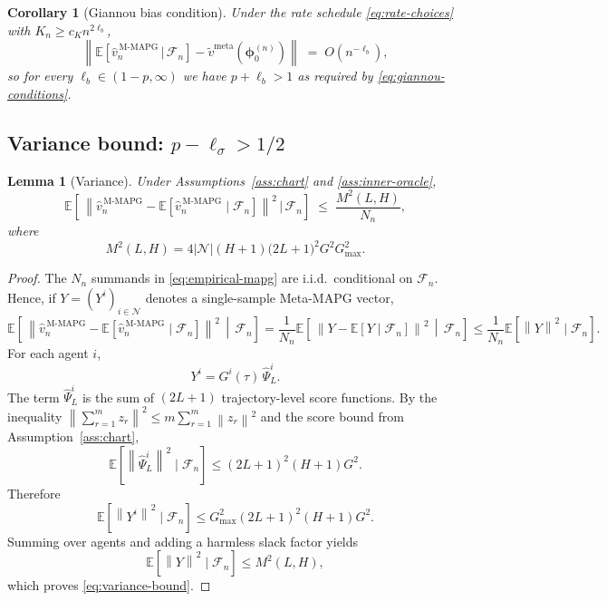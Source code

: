 \documentclass[11pt]{article}
\newtheorem{lemma}[theorem]{Lemma}
\newtheorem{corollary}[theorem]{Corollary}
\theoremstyle{definition}
\newcommand{\E}{\mathbb{E}}
\newcommand{\norm}[1]{\left\lVert #1 \right\rVert}
\newcommand{\calF}{\mathcal{F}}
\newcommand{\calN}{\mathcal{N}}
\newcommand{\meta}{\mathrm{meta}}
\newcommand{\MAPG}{\mathrm{M\text{-}MAPG}}
\begin{document}
\begin{corollary}[Giannou bias condition]\label{cor:bias-rate}
Under the rate schedule \eqref{eq:rate-choices} with $K_n\ge c_K n^{2\ell_b}$,
\begin{equation}\label{eq:bias-rate}
\norm{\E\!\left[\hat v_n^{\,\MAPG}\,\big|\,\calF_n\right]-\widetilde v^\meta(\bm\phi_0^{(n)})}
\;=\;O(n^{-\ell_b}),
\end{equation}
so for every $\ell_b\in(1-p,\infty)$ we have $p+\ell_b>1$ as required by \eqref{eq:giannou-conditions}.
\end{corollary}

\subsection{Variance bound: $p-\ell_\sigma>1/2$}

\begin{lemma}[Variance]\label{lem:variance}
Under Assumptions~\ref{ass:chart} and \ref{ass:inner-oracle},
\begin{equation}\label{eq:variance-bound}
\E\!\left[\,\norm{\hat v_n^{\,\MAPG}-\E[\hat v_n^{\,\MAPG}\mid\calF_n]}^2\,\big|\,\calF_n\right]
\;\le\;
\frac{M^2(L,H)}{N_n},
\end{equation}
where
\begin{equation*}
M^2(L,H)=4|\calN|(H+1)\bigl(2L+1\bigr)^2 G^2 G_{\max}^2.
\end{equation*}
\end{lemma}

\begin{proof}
The $N_n$ summands in \eqref{eq:empirical-mapg} are i.i.d.\ conditional on $\calF_n$. Hence, if $Y=(Y^i)_{i\in\calN}$ denotes a single-sample Meta-MAPG vector,
\[
\E\!\left[\,\norm{\hat v_n^{\,\MAPG}-\E[\hat v_n^{\,\MAPG}\mid\calF_n]}^2\,\middle|\,\calF_n\right]
=
\frac{1}{N_n}\E\!\left[\,\norm{Y-\E[Y\mid\calF_n]}^2\,\middle|\,\calF_n\right]
\le
\frac{1}{N_n}\E[\norm{Y}^2\mid\calF_n].
\]
For each agent $i$,
\[
Y^i=G^i(\tau)\,\hat\Psi^i_L.
\]
The term $\hat\Psi^i_L$ is the sum of $(2L+1)$ trajectory-level score functions. By the inequality $\norm{\sum_{r=1}^m z_r}^2\le m\sum_{r=1}^m\norm{z_r}^2$ and the score bound from Assumption~\ref{ass:chart},
\[
\E[\norm{\hat\Psi^i_L}^2\mid\calF_n]\le (2L+1)^2(H+1)G^2.
\]
Therefore
\[
\E[\norm{Y^i}^2\mid\calF_n]\le G_{\max}^2(2L+1)^2(H+1)G^2.
\]
Summing over agents and adding a harmless slack factor yields
\[
\E[\norm{Y}^2\mid\calF_n]\le M^2(L,H),
\]
which proves \eqref{eq:variance-bound}.
\end{proof}
\end{document}
